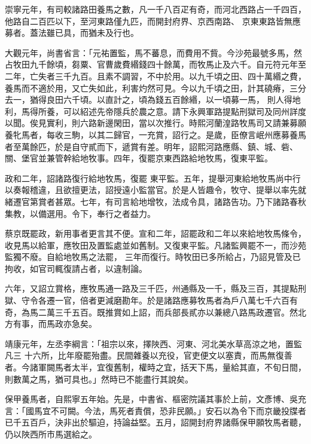 \begin{pinyinscope}
 崇寧元年，有司較諸路田養馬之數，凡一千八百疋有奇，而河北西路占一千四百，他路自二百匹以下，至河東路僅九匹，而開封府界、京西南路、
 京東東路皆無應募者。蓋法雖已具，而猶未及行也。



 大觀元年，尚書省言：「元祐置監，馬不蕃息，而費用不貲。今沙苑最號多馬，然占牧田九千餘頃，芻粟、官曹歲費緡錢四十餘萬，而牧馬止及六千。自元符元年至二年，亡失者三千九百。且素不調習，不中於用。以九千頃之田、四十萬緡之費，養馬而不適於用，又亡失如此，利害灼然可見。今以九千頃之田，計其磽瘠，三分去一，猶得良田六千頃。以直計之，頃為錢五百餘緡，以一頃募一馬，
 則人得地利，馬得所養，可以紹述先帝隱兵於農之意。請下永興軍路提點刑獄司及同州詳度以聞。俟見實利，則六路新邊閑田，當以次推行。時熙河蘭湟路牧馬司又請兼募願養牝馬者，每收三駒，以其二歸官，一充賞，詔行之。是歲，臣僚言岷州應募養馬者至萬餘匹，於是自守貳而下，遞賞有差。明年，詔熙河路應縣、鎮、城、砦、關、堡官並兼管幹給地牧事。四年，復罷京東西路給地牧馬，復東平監。



 政和二年，詔諸路復行給地牧馬，復罷
 東平監。五年，提舉河東給地牧馬尚中行以奏報稽違，且欲擅更法，詔授遠小監當官。於是人皆趣令，牧守、提舉以率先就緒遷官第賞者甚眾。七年，有司言給地增牧，法成令具，諸路告功。乃下諸路春秋集教，以備選用。令下，奉行之者益力。



 蔡京既罷政，新用事者更言其不便。宣和二年，詔罷政和二年以來給地牧馬條令，收見馬以給軍，應牧田及置監處並如舊制。又復東平監。凡諸監興罷不一，而沙苑監獨不廢。自給地牧馬之法罷，
 三年而復行。時牧田已多所給占，乃詔見管及已拘收，如官司輒復請占者，以違制論。



 六年，又詔立賞格，應牧馬通一路及三千匹，州通縣及一千，縣及三百，其提點刑獄、守令各遷一官，倍者更減磨勘年。於是諸路應募牧馬者為戶八萬七千六百有奇，為馬二萬三千五百。既推賞如上詔，而兵部長貳亦以兼總八路馬政遷官。然北方有事，而馬政亦急矣。



 靖康元年，左丞李綱言：「祖宗以來，擇陜西、河東、河北美水草高涼之地，置監凡三
 十六所，比年廢罷殆盡。民間雜養以充役，官吏便文以塞責，而馬無復善者。今諸軍闕馬者太半，宜復舊制，權時之宜，括天下馬，量給其直，不旬日間，則數萬之馬，猶可具也。」然時已不能盡行其說矣。



 保甲養馬者，自熙寧五年始。先是，中書省、樞密院議其事於上前，文彥博、吳充言：「國馬宜不可闕。今法，馬死者責償，恐非民願。」安石以為令下而京畿投牒者已千五百戶，決非出於驅迫，持論益堅。五月，詔開封府界諸縣保甲願牧馬者聽，
 仍以陜西所市馬選給之。




\end{pinyinscope}
